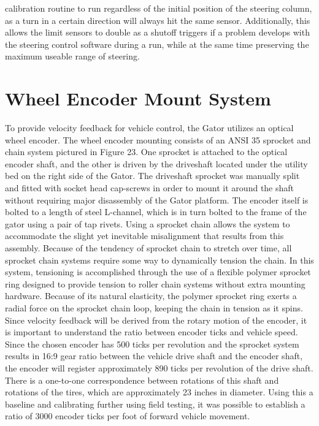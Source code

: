 

\noindent calibration routine to run regardless of the initial position of the steering column, as a turn in a certain direction will always hit the same sensor. Additionally, this allows the limit sensors to double as a shutoff triggers if a problem develops with the steering control software during a run, while at the same time preserving the maximum useable range of steering.

\section{Wheel Encoder Mount System}
To provide velocity feedback for vehicle control, the Gator utilizes an optical wheel encoder. The wheel encoder mounting consists of an ANSI 35 sprocket and chain system pictured in Figure 23. One sprocket is attached to the optical encoder shaft, and the other is driven by the driveshaft located under the utility bed on the right side of the Gator. The driveshaft sprocket was manually split and fitted with socket head cap-screws in order to mount it around the shaft without requiring major disassembly of the Gator platform. The encoder itself is bolted to a length of steel L-channel, which is in turn bolted to the frame of the gator using a pair of tap rivets. Using a sprocket chain allows the system to accommodate the slight yet inevitable misalignment that results from this assembly. Because of the tendency of sprocket chain to stretch over time, all sprocket chain systems require some way to dynamically tension the chain. In this system, tensioning is accomplished through the use of a flexible polymer sprocket ring designed to provide tension to roller chain systems without extra mounting hardware. Because of its natural elasticity, the polymer sprocket ring exerts a radial force on the sprocket chain loop, keeping the chain in tension
as it spins. Since velocity feedback will be derived from the rotary motion of the encoder, it is important to understand the ratio between encoder ticks and vehicle speed. Since the chosen encoder has 500 ticks per revolution and the sprocket system results in 16:9 gear ratio between the vehicle drive shaft and the encoder shaft, the encoder will register approximately 890 ticks per revolution of the drive shaft. There is a one-to-one correspondence between rotations of this shaft and rotations of the tires, which are approximately 23 inches in diameter. Using this a baseline and calibrating further using field testing, it was possible to establish a ratio of 3000 encoder ticks per foot of forward vehicle movement.


